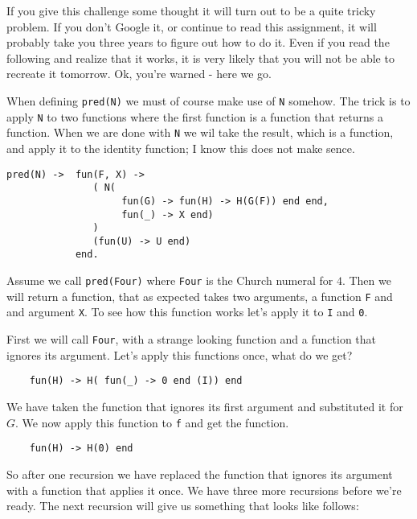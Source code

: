 \documentclass[a4paper,11pt]{article}
\begin{document}
If you give this challenge some thought it will turn out to be a quite
tricky problem. If you don't Google it, or continue to read this
assignment, it will probably take you three years to figure out how to
do it. Even if you read the following and realize that it works, it is
very likely that you will not be able to recreate it tomorrow. Ok,
you're warned - here we go.

When defining {\tt pred(N)} we must of course make use of {\tt N}
somehow. The trick is to apply {\tt N} to two functions where the
first function is a function that returns a function. When we are done
with {\tt N} we wil take the result, which is a function, and apply it
to the identity function; I know this does not make sence. 

\begin{verbatim}
pred(N) ->  fun(F, X) -> 
               ( N(                                        
                    fun(G) -> fun(H) -> H(G(F)) end end,   
                    fun(_) -> X end)                       
               )                                           
               (fun(U) -> U end)                           
            end.
\end{verbatim}

Assume we call {\tt pred(Four)} where {\tt Four} is the Church numeral
for $4$. Then we will return a function, that as expected takes two
arguments, a function {\tt F} and and argument {\tt X}. To see how
this function works let's apply it to {\tt I} and {\tt 0}.

First we will call {\tt Four}, with a strange looking function and a
function that ignores its argument. Let's apply this functions once,
what do we get?

\begin{verbatim}
    fun(H) -> H( fun(_) -> 0 end (I)) end 
\end{verbatim}

We have taken the function that ignores its first argument and
substituted it for $G$. We now apply this function to {\tt f} and get
the function.

\begin{verbatim}
    fun(H) -> H(0) end
\end{verbatim}

So after one recursion we have replaced the function that ignores its
argument with a function that applies it once.  We have three more
recursions before we're ready. The next recursion will give us
something that looks like follows:
\end{document}
